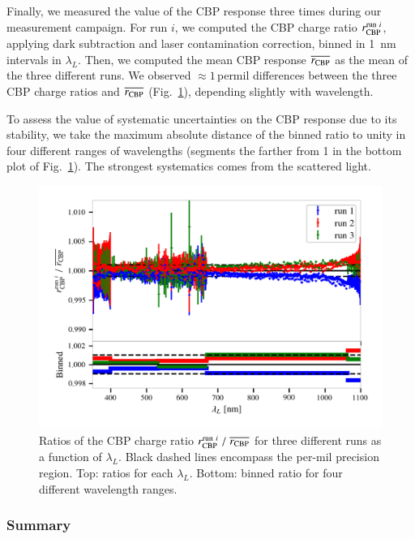 Finally, we measured the value of the CBP response three times during our measurement campaign. For run $i$, we computed the CBP charge ratio $r_{\rm CBP}^{\mathrm{run}\ i}$, applying dark subtraction and laser contamination correction, binned in \SI{1}{\nano\meter} intervals in $\lambda_L$. Then, we computed the mean CBP response $\overline{r_{\rm CBP}}$ as the mean of the three different runs. We observed $\approx 1$\,permil differences between the three CBP charge ratios and $\overline{r_{\rm CBP}}$ (Fig.~\ref{fig:SCrepeatability}), depending slightly with wavelength.


To assess the value of systematic uncertainties on the CBP response due to its stability, we take the maximum absolute distance of the binned ratio to unity in four different ranges of wavelengths (segments the farther from 1 in the bottom plot of Fig.~\ref{fig:SCrepeatability}). The strongest systematics comes from the scattered light.

\begin{figure}%
    \centering
    \includegraphics[width=\columnwidth]{fig/sc_runi_ratios.png}
    \caption{Ratios of the CBP charge ratio $r_{\rm CBP}^{\mathrm{run}\ i}\;/\;\overline{r_{\rm CBP}}$ for three different runs as a function of $\lambda_L$. Black dashed lines encompass the per-mil precision region. Top: ratios for each $\lambda_L$. Bottom: binned ratio for four different wavelength ranges.}
    \label{fig:SCrepeatability}
\end{figure}

\subsubsection{Summary}\label{sec:cbp_summary}

